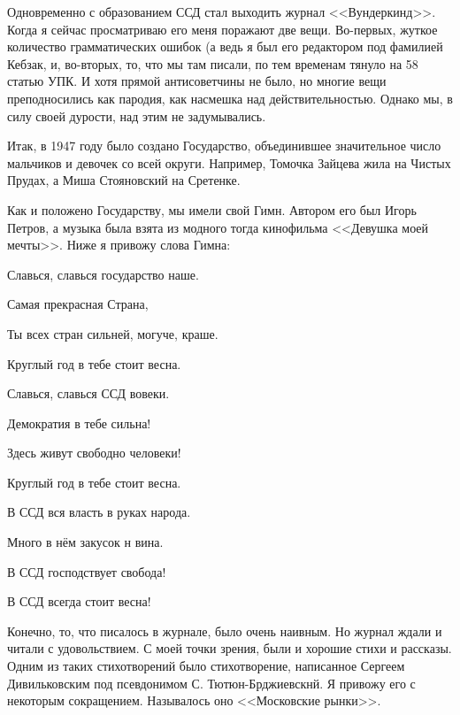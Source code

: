 Одновременно с образованием ССД стал выходить журнал <<Вундеркинд>>. Когда я сейчас просматриваю его меня поражают две вещи. Во-первых, жуткое количество грамматических ошибок (а ведь я был его редактором под фамилией Кебзак, и, во-вторых, то, что мы там писали, по тем временам тянуло на 58 статью УПК. И хотя прямой антисоветчины не было, но многие вещи преподносились как пародия, как насмешка над действительностью. Однако мы, в силу своей дурости, над этим не задумывались.

Итак, в 1947 году было создано Государство, объединившее значительное число мальчиков и девочек со всей округи. Например, Томочка Зайцева жила на Чистых Прудах, а Миша Стояновский на Сретенке.

Как и положено Государству, мы имели свой Гимн. Автором его был Игорь Петров, а музыка была взята из модного тогда кинофильма <<Девушка моей мечты>>. Ниже я привожу слова Гимна:

\indent

{\itshape

Славься, славься государство наше.

Самая прекрасная Страна,

Ты всех стран сильней, могуче, краше.

Круглый год в тебе стоит весна.

\indent

Славься, славься ССД вовеки.

Демократия в тебе сильна! 

Здесь живут свободно человеки! 

Круглый год в тебе стоит весна.

\indent

В ССД вся власть в руках народа.

Много в нём закусок н вина.

В ССД господствует свобода!

В ССД всегда стоит весна!
}

\indent

Конечно, то, что писалось в журнале, было очень наивным. Но журнал ждали и читали с удовольствием. С моей точки зрения, были и хорошие стихи и рассказы. Одним из таких стихотворений было стихотворение, написанное Сергеем Дивильковским под псевдонимом С. Тютюн-Брджиевскнй. Я привожу его с некоторым сокращением. Называлось оно <<Московские рынки>>.

\indent

